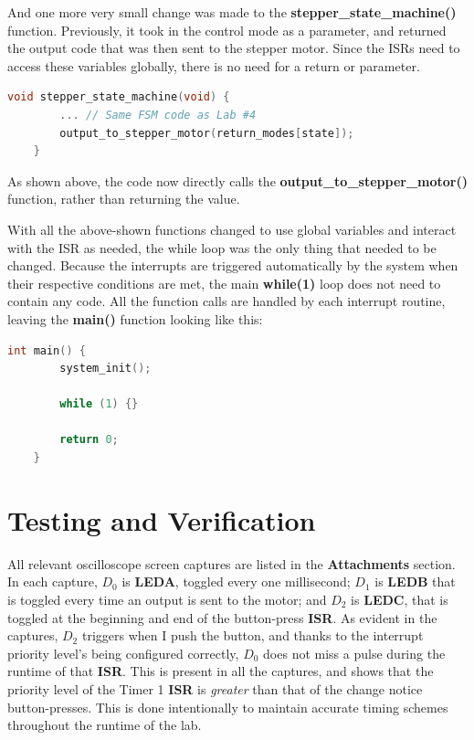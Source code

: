 \documentclass[a4paper, 12pt]{article}
\begin{document}
And one more very small change was made to the \textbf{stepper\_state\_machine()} function. Previously, it took in the control mode as a parameter, and returned the output code that was then sent to the stepper motor. Since the ISRs need to access these variables globally, there is no need for a return or parameter.

	\begin{mdframed}[backgroundcolor=code-gray, roundcorner=10pt,
								innerleftmargin=5, innertopmargin=5, innerbottommargin=5]	
	\begin{lstlisting}[language=C, caption=Revised Finite State Machine, tabsize=2]
	void stepper_state_machine(void) {
		... // Same FSM code as Lab #4
		output_to_stepper_motor(return_modes[state]);
	}
	\end{lstlisting}
	\end{mdframed}
	
As shown above, the code now directly calls the \textbf{output\_to\_stepper\_motor()} function, rather than returning the value. 

With all the above-shown functions changed to use global variables and interact with the ISR as needed, the while loop was the only thing that needed to be changed. Because the interrupts are triggered automatically by the system when their respective conditions are met, the main \textbf{while(1)} loop does not need to contain any code. All the function calls are handled by each interrupt routine, leaving the \textbf{main()} function looking like this:

	\begin{mdframed}[backgroundcolor=code-gray, roundcorner=10pt,
								innerleftmargin=5, innertopmargin=5, innerbottommargin=5]	
	\begin{lstlisting}[language=C, caption=Infinite Program Loop, tabsize=2]
	int main() {
		system_init();
	
		while (1) {}
	
		return 0;
	}
	\end{lstlisting}
	\end{mdframed}
	

	
\section{Testing and Verification}
All relevant oscilloscope screen captures are listed in the \textbf{Attachments} section. In each capture, $D_0$ is \textbf{LEDA}, toggled every one millisecond; $D_1$ is \textbf{LEDB} that is toggled every time an output is sent to the motor; and $D_2$ is \textbf{LEDC}, that is toggled at the beginning and end of the button-press \textbf{ISR}. As evident in the captures, $D_2$ triggers when I push the button, and thanks to the interrupt priority level's being configured correctly, $D_0$ does not miss a pulse during the runtime of that \textbf{ISR}. This is present in all the captures, and shows that the priority level of the Timer 1 \textbf{ISR} is \textit{greater} than that of the change notice button-presses. This is done intentionally to maintain accurate timing schemes throughout the runtime of the lab.
\end{document}
